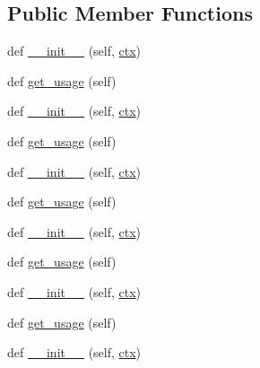 \subsection*{Public Member Functions}
\begin{DoxyCompactItemize}
\item 
def \hyperlink{classwaflib_1_1_options_1_1opt__parser_a931e9b8c1992ee0a2f7c2d7bc52477c5}{\+\_\+\+\_\+init\+\_\+\+\_\+} (self, \hyperlink{classwaflib_1_1_options_1_1opt__parser_a029613ddb2249932b730c361af4040e5}{ctx})
\item 
def \hyperlink{classwaflib_1_1_options_1_1opt__parser_a23e93da89f803bd57c5a70182c877e1d}{get\+\_\+usage} (self)
\item 
def \hyperlink{classwaflib_1_1_options_1_1opt__parser_a931e9b8c1992ee0a2f7c2d7bc52477c5}{\+\_\+\+\_\+init\+\_\+\+\_\+} (self, \hyperlink{classwaflib_1_1_options_1_1opt__parser_a029613ddb2249932b730c361af4040e5}{ctx})
\item 
def \hyperlink{classwaflib_1_1_options_1_1opt__parser_a23e93da89f803bd57c5a70182c877e1d}{get\+\_\+usage} (self)
\item 
def \hyperlink{classwaflib_1_1_options_1_1opt__parser_a931e9b8c1992ee0a2f7c2d7bc52477c5}{\+\_\+\+\_\+init\+\_\+\+\_\+} (self, \hyperlink{classwaflib_1_1_options_1_1opt__parser_a029613ddb2249932b730c361af4040e5}{ctx})
\item 
def \hyperlink{classwaflib_1_1_options_1_1opt__parser_a23e93da89f803bd57c5a70182c877e1d}{get\+\_\+usage} (self)
\item 
def \hyperlink{classwaflib_1_1_options_1_1opt__parser_a931e9b8c1992ee0a2f7c2d7bc52477c5}{\+\_\+\+\_\+init\+\_\+\+\_\+} (self, \hyperlink{classwaflib_1_1_options_1_1opt__parser_a029613ddb2249932b730c361af4040e5}{ctx})
\item 
def \hyperlink{classwaflib_1_1_options_1_1opt__parser_a23e93da89f803bd57c5a70182c877e1d}{get\+\_\+usage} (self)
\item 
def \hyperlink{classwaflib_1_1_options_1_1opt__parser_a931e9b8c1992ee0a2f7c2d7bc52477c5}{\+\_\+\+\_\+init\+\_\+\+\_\+} (self, \hyperlink{classwaflib_1_1_options_1_1opt__parser_a029613ddb2249932b730c361af4040e5}{ctx})
\item 
def \hyperlink{classwaflib_1_1_options_1_1opt__parser_a23e93da89f803bd57c5a70182c877e1d}{get\+\_\+usage} (self)
\item 
def \hyperlink{classwaflib_1_1_options_1_1opt__parser_a931e9b8c1992ee0a2f7c2d7bc52477c5}{\+\_\+\+\_\+init\+\_\+\+\_\+} (self, \hyperlink{classwaflib_1_1_options_1_1opt__parser_a029613ddb2249932b730c361af4040e5}{ctx})

\end{DoxyCompactItemize}
